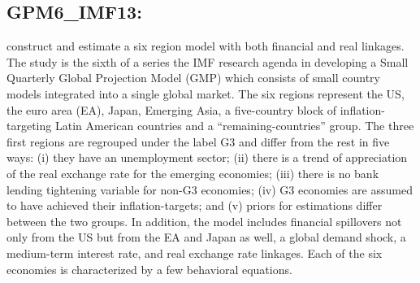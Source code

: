 \documentclass[11pt,a4paper]{article}
\begin{document}
	\subsection{GPM6\_IMF13: \cite{Carabenciovetal2013}}
	\label{GPM6IMF13}
	\cite{Carabenciovetal2013} construct and estimate a six region model with both financial and real linkages. The study is the sixth of a series the IMF research agenda in developing a Small Quarterly Global Projection Model (GMP) which consists of small country models integrated into a single global market. The six regions represent the US, the euro area (EA), Japan, Emerging Asia, a five-country block of inflation-targeting Latin American countries and a ``remaining-countries'' group. The three first regions are regrouped under the label G3 and differ from the rest in five ways: (i) they have an unemployment sector; (ii) there is a trend of appreciation of the real exchange rate for the emerging economies; (iii) there is no bank lending tightening variable for non-G3 economies; (iv) G3 economies are assumed to have achieved their inflation-targets; and (v) priors for estimations differ between the two groups. In addition, the model includes financial spillovers not only from the US but from the EA and Japan as well, a global demand shock, a medium-term interest rate, and real exchange rate linkages. Each of the six economies is characterized by a few behavioral equations. 
\end{document}
